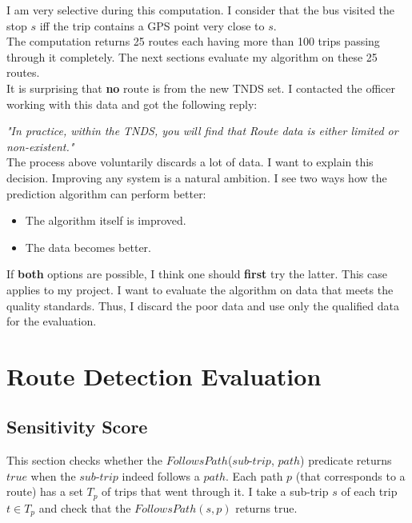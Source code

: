 \documentclass[12pt,a4paper,oneside,openright]{report}
\begin{document}
I am very selective during this computation. I consider that the bus visited
the stop $s$ iff the trip contains a GPS point very close to $s$. \\



The computation returns 25 routes each having more than 100 trips passing through it completely. The next
sections evaluate my algorithm on these 25 routes. \\

It is surprising that \textbf{no} route is from the new TNDS set. I contacted the officer
working with this data and got the following reply:

\textit{"In practice, within the TNDS, you will find that Route data is either limited or
non-existent."} \\

The process above voluntarily discards a lot of data. I want to explain this decision.
Improving any system is a natural ambition. I see two ways how the prediction algorithm can
perform better:

\begin{itemize} 
\item The algorithm itself is improved.
\item The data becomes better.
\end{itemize}

If \textbf{both} options are possible, I think one should \textbf{first} try the latter.
This case applies to my project. I want to evaluate the algorithm on data that meets
the quality standards. Thus, I discard the poor data and use only the qualified data for the
evaluation. \\


\section{Route Detection Evaluation}

\subsection{Sensitivity Score}

This section checks whether the $FollowsPath$($sub$-$trip$, $path$) predicate returns $true$
when the $sub$-$trip$ indeed follows a $path$. Each path $p$ (that corresponds to a route)
has a set $T_p$ of trips that went through it. I take a sub-trip $s$ of each trip $t \in T_p$
and check that the $FollowsPath(s, p)$ returns true. \\
\end{document}
